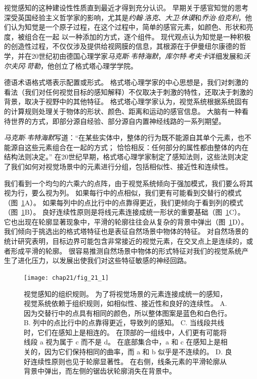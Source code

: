 视觉感知的这种建设性性质直到最近才得到充分认识。
早期关于感官知觉的思考深受英国经验主义哲学家的影响，尤其是\textit{约翰$\cdot$洛克}、\textit{大卫$\cdot$休谟}和\textit{乔治$\cdot$伯克利}，他们认为知觉是一个原子过程，在这个过程中，简单的感官元素，如颜色、形状和亮度，被组合在一起 以一种添加的方式，逐个组件。
现代观点认为知觉是一种积极的创造性过程，不仅仅涉及提供给视网膜的信息，其根源在于伊曼纽尔康德的哲学，并在20世纪初由德国心理学家\textit{马克斯$\cdot$韦特海默}，\textit{库尔特$\cdot$考夫卡}详细发展和\textit{沃尔夫冈$\cdot$苛勒}，他创立了格式塔心理学学院。


德语术语格式塔表示配置或形式。
格式塔心理学家的中心思想是，我们对刺激的看法（我们对任何视觉目标的感知解释）不仅取决于刺激的特性，还取决于刺激的背景，取决于视野中的其他特征。
格式塔心理学家认为，视觉系统根据系统固有的计算规则处理关于物体的形状、颜色、距离和运动的感官信息。
大脑有一种看待世界的方式，即部分源自经验、部分源自内置神经线路的一系列期望。


\textit{马克斯$\cdot$韦特海默}写道：“在某些实体中，整体的行为既不能源自其单个元素，也不能源自这些元素组合在一起的方式；
恰恰相反：任何部分的属性都由整体的内在结构法则决定。” 
在20世纪早期，格式塔心理学家制定了感知法则，这些法则决定了我们如何对视觉场景中的元素进行分组，包括相似性、接近性和连续性。


我们看到一个均匀的六乘六的点阵，由于视觉系统倾向于强加模式，我们要么将其视为行，要么视为列。
如果每行中的点相似，我们更有可能看到交替行的模式（图~\ref{fig:21_1}A）。
如果每列中的点比行中的点靠得更近，我们更倾向于看到列的模式（图~\ref{fig:21_1}B）。
良好连续性原则是将线元素连接成统一形状的重要基础（图~\ref{fig:21_1}C）。
它也出现在轮廓显著现象中，平滑的轮廓往往会从复杂的背景中弹出（图~\ref{fig:21_1}D）。
我们倾向于挑选出的格式塔特征也是表征自然场景中物体的特征。
对自然场景的统计研究表明，目标边界可能包含非常接近的视觉元素，在交叉点上是连续的，或者形成平滑的轮廓。
很容易推测自然场景中物体的形式特征对我们的视觉系统产生了进化压力，以发展出使我们对这些特征敏感的神经回路。


\begin{figure}[htbp]
	\centering
	\texttt{[image: chap21/fig\_21\_1]}
	\caption{视觉感知的组织规则。
		为了将视觉场景的元素连接成统一的感知，视觉系统依赖于组织规则，如相似性、接近性和良好的连续性。
		A. 因为交替行中的点具有相同的颜色，所以整体图案是蓝色和白色行。
		B. 列中的点比行中的点靠得更近，导致列的感知。
		C. 当线段共线时，它们在感知上是相连的。
		在顶部的一组线中，人们更有可能将线段 a 视为属于 c 而不是 d。
		在底部集合中，a 和 c 在感知上是相关的，因为它们保持相同的曲率，而 a 和 b 似乎是不连续的。
		D. 良好连续性原则也见于轮廓显著性。
		在右侧，线条元素的平滑轮廓从背景中弹出，而左侧的锯齿状轮廓消失在背景中\cite{field1993contour}。}
	\label{fig:21_1}
\end{figure}


